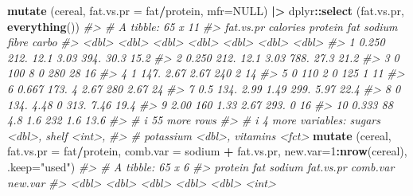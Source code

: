 \documentclass[
]{book}
\newenvironment{Shaded}{\begin{snugshade}}{\end{snugshade}}
\newcommand{\AttributeTok}[1]{\textcolor[rgb]{0.13,0.29,0.53}{#1}}
\newcommand{\CommentTok}[1]{\textcolor[rgb]{0.56,0.35,0.01}{\textit{#1}}}
\newcommand{\ConstantTok}[1]{\textcolor[rgb]{0.56,0.35,0.01}{#1}}
\newcommand{\DecValTok}[1]{\textcolor[rgb]{0.00,0.00,0.81}{#1}}
\newcommand{\FunctionTok}[1]{\textcolor[rgb]{0.13,0.29,0.53}{\textbf{#1}}}
\newcommand{\NormalTok}[1]{#1}
\newcommand{\SpecialCharTok}[1]{\textcolor[rgb]{0.81,0.36,0.00}{\textbf{#1}}}
\newcommand{\StringTok}[1]{\textcolor[rgb]{0.31,0.60,0.02}{#1}}
\begin{document}
\begin{Shaded}
\begin{Highlighting}[]
\FunctionTok{mutate}\NormalTok{ (cereal, }\AttributeTok{fat.vs.pr =}\NormalTok{ fat}\SpecialCharTok{/}\NormalTok{protein, }\AttributeTok{mfr=}\ConstantTok{NULL}\NormalTok{) }\SpecialCharTok{|\textgreater{}}
\NormalTok{     dplyr}\SpecialCharTok{::}\FunctionTok{select}\NormalTok{ (fat.vs.pr, }\FunctionTok{everything}\NormalTok{())}
\CommentTok{\#\textgreater{} \# A tibble: 65 x 11}
\CommentTok{\#\textgreater{}    fat.vs.pr calories protein   fat sodium fibre carbo}
\CommentTok{\#\textgreater{}        \textless{}dbl\textgreater{}    \textless{}dbl\textgreater{}   \textless{}dbl\textgreater{} \textless{}dbl\textgreater{}  \textless{}dbl\textgreater{} \textless{}dbl\textgreater{} \textless{}dbl\textgreater{}}
\CommentTok{\#\textgreater{}  1     0.250     212.   12.1   3.03   394. 30.3   15.2}
\CommentTok{\#\textgreater{}  2     0.250     212.   12.1   3.03   788. 27.3   21.2}
\CommentTok{\#\textgreater{}  3     0         100     8     0      280  28     16  }
\CommentTok{\#\textgreater{}  4     1         147.    2.67  2.67   240   2     14  }
\CommentTok{\#\textgreater{}  5     0         110     2     0      125   1     11  }
\CommentTok{\#\textgreater{}  6     0.667     173.    4     2.67   280   2.67  24  }
\CommentTok{\#\textgreater{}  7     0.5       134.    2.99  1.49   299.  5.97  22.4}
\CommentTok{\#\textgreater{}  8     0         134.    4.48  0      313.  7.46  19.4}
\CommentTok{\#\textgreater{}  9     2.00      160     1.33  2.67   293.  0     16  }
\CommentTok{\#\textgreater{} 10     0.333      88     4.8   1.6    232   1.6   13.6}
\CommentTok{\#\textgreater{} \# i 55 more rows}
\CommentTok{\#\textgreater{} \# i 4 more variables: sugars \textless{}dbl\textgreater{}, shelf \textless{}int\textgreater{},}
\CommentTok{\#\textgreater{} \#   potassium \textless{}dbl\textgreater{}, vitamins \textless{}fct\textgreater{}}
\FunctionTok{mutate}\NormalTok{ (cereal, }\AttributeTok{fat.vs.pr =}\NormalTok{ fat}\SpecialCharTok{/}\NormalTok{protein, }
                 \AttributeTok{comb.var =}\NormalTok{ sodium }\SpecialCharTok{+}\NormalTok{ fat.vs.pr,}
                 \AttributeTok{new.var=}\DecValTok{1}\SpecialCharTok{:}\FunctionTok{nrow}\NormalTok{(cereal), }\AttributeTok{.keep=}\StringTok{"used"}\NormalTok{)}
\CommentTok{\#\textgreater{} \# A tibble: 65 x 6}
\CommentTok{\#\textgreater{}    protein   fat sodium fat.vs.pr comb.var new.var}
\CommentTok{\#\textgreater{}      \textless{}dbl\textgreater{} \textless{}dbl\textgreater{}  \textless{}dbl\textgreater{}     \textless{}dbl\textgreater{}    \textless{}dbl\textgreater{}   \textless{}int\textgreater{}}

\end{Highlighting}
\end{Shaded}
\end{document}
